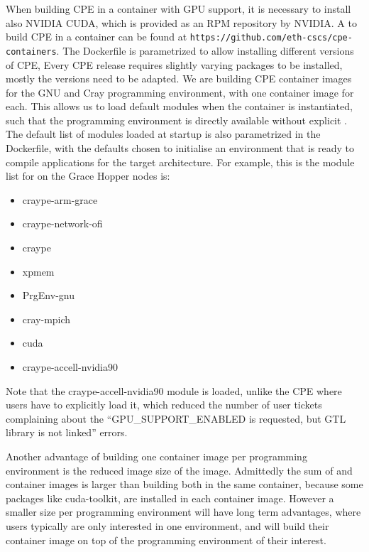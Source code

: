 When building CPE in a container with GPU support, it is necessary to install also NVIDIA CUDA, which is provided as an RPM repository by NVIDIA.
A  to build CPE in a container can be found at \lstinline{https://github.com/eth-cscs/cpe-containers}. The Dockerfile is parametrized to allow installing different versions of CPE,
Every CPE release requires slightly varying packages to be installed, mostly the versions need to be adapted.
We are building CPE container images for the GNU and Cray programming environment, with one container image for each.
This allows us to load default modules when the container is instantiated, such that the programming environment is directly available without explicit .
The default list of modules loaded at startup is also parametrized in the Dockerfile, with the defaults chosen to initialise an environment that is ready to compile applications for the target architecture.
For example, this is the module list for  on the Grace Hopper nodes is:
\begin{itemize}
    \item craype-arm-grace
    \item craype-network-ofi
    \item craype
    \item xpmem
    \item PrgEnv-gnu
    \item cray-mpich
    \item cuda
    \item craype-accell-nvidia90
\end{itemize}
Note that the craype-accell-nvidia90 module is loaded, unlike the CPE where users have to explicitly load it, which reduced the number of user tickets complaining about the ``GPU\_SUPPORT\_ENABLED is requested, but GTL library is not linked'' errors.

Another advantage of building one container image per programming environment is the reduced image size of the image.
Admittedly the sum of  and  container images is larger than building both in the same container, because some packages like cuda-toolkit, are installed in each container image.
However a smaller size per programming environment will have long term advantages, where users typically are only interested in one environment, and will build their container image on top of the programming environment of their interest.

